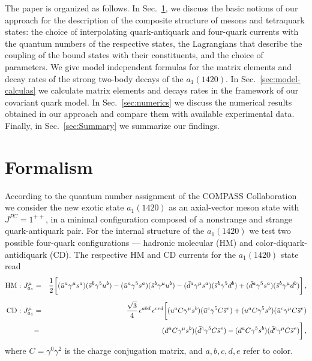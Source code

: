 \documentclass[aps,prd,floatfix,superscriptaddress,showpacs,showkeys]{revtex4}
\newcommand{\bea}{\begin{eqnarray}}
\newcommand{\ena}{\end{eqnarray}}
\begin{document}
The paper is organized as follows. In Sec.~\ref{sec:formalism}, we 
discuss the basic notions of our approach for the description of the composite 
structure of mesons and tetraquark states: the choice of interpolating
quark-antiquark and four-quark currents with the quantum numbers of the
respective states, the Lagrangians that 
describe the coupling of the bound states with their constituents, 
and the choice of parameters. 
We give model independent formulas for the matrix elements and decay rates
of the strong two-body decays of the $a_1(1420)$. 
In Sec.~\ref{sec:model-calculas} we calculate matrix elements
and decays rates in the framework of our covariant quark model.
In Sec.~\ref{sec:numerics} we discuss the numerical results obtained
in our approach and compare them with available experimental data.
Finally, in  Sec.~\ref{sec:Summary} we summarize our findings.


\section{Formalism} 
\label{sec:formalism}

According to the quantum number assignment of 
the COMPASS Collaboration~\cite{Adolph:2015pws} 
we consider the new exotic state $a_1(1420)$ as an axial-vector meson state 
with $J^{PC} = 1^{++}$, in a minimal configuration composed of a nonstrange 
and strange quark-antiquark pair. 
For the internal structure of the $a_1(1420)$  we test two possible four-quark 
configurations --- hadronic molecular (HM) and color-diquark-antidiquark (CD). 
The respective HM and CD currents for the $a_1(1420)$ state read 
\bea
{\rm HM:} \  J^\mu_{a_1} &=& \frac{1}{2} 
\biggl[ (\bar u^a \gamma^\mu s^a) (\bar s^b  \gamma^5   u^b)
      - (\bar u^a \gamma^5   s^a) (\bar s^b  \gamma^\mu u^b) 
      - (\bar d^a \gamma^\mu s^a) (\bar s^b  \gamma^5   d^b)
      + (\bar d^a \gamma^5   s^a) (\bar s^b  \gamma^\mu d^b) 
\biggr]\,, 
\label{eq:a1-curHM}\\[2mm]
{\rm CD:} \  J^\mu_{a_1} &=& \frac{\sqrt{3}}{4} \, 
\epsilon^{abd} \, \epsilon^{ced}
\biggl[   (u^a C \gamma^\mu s^b) (\bar u^c  \gamma^5 C \bar s^e)
        + (u^a C \gamma^5   s^b) (\bar u^c  \gamma^\mu C \bar s^e)
\nonumber\\
      &-& (d^a C \gamma^\mu s^b) (\bar d^c  \gamma^5 C \bar s^e)
       -  (d^a C \gamma^5   s^b) (\bar d^c  \gamma^\mu C \bar s^e)
\biggr]
\label{eq:a1-curCD}\,,  
\ena 
where $C = \gamma^0 \gamma^2$ is the charge conjugation matrix, 
and $a,b,c,d,e$ refer to color. 
\end{document}
